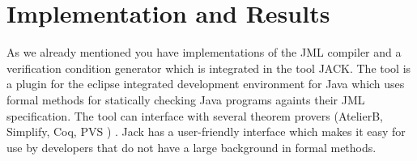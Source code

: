 \section{Implementation and Results}
 As we already mentioned you have implementations of the JML compiler and a verification condition generator which is integrated in the tool JACK.
 The tool is a plugin for the eclipse  integrated development environment for Java which uses formal methods for
statically checking Java programs againts their JML specification. The tool can interface with several theorem provers (AtelierB, 
Simplify, Coq, PVS ) . Jack has a user-friendly interface which makes it easy for use by developers that do not have
a large background in formal methods.


